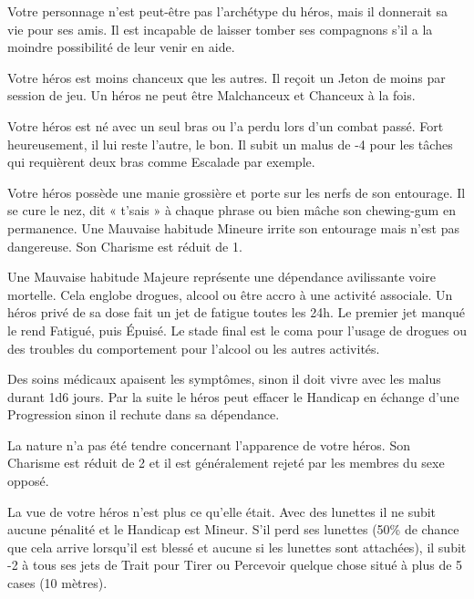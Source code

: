 \begin{description}[align=left]
    \item [Loyal (Mineur)]
        Votre personnage n’est peut-être pas l’archétype du héros, mais il donnerait sa vie pour ses amis. Il est incapable de laisser tomber ses compagnons s’il a la moindre possibilité de leur venir en aide.

    \item [Malchanceux (Majeur)]
        Votre héros est moins chanceux que les autres. Il reçoit un Jeton de moins par session de jeu. Un héros ne peut être Malchanceux et Chanceux à la fois.

    \item [Manchot (Majeur)]
        Votre héros est né avec un seul bras ou l’a perdu lors d’un combat passé. Fort heureusement, il lui reste l’autre, le bon. Il subit un malus de -4 pour les tâches qui requièrent deux bras comme Escalade par exemple.

    \item [Mauvaise habitude (Mineur ou Majeur)]
        Votre héros possède une manie grossière et porte sur les nerfs de son entourage. Il se cure le nez, dit « t’sais » à chaque phrase ou bien mâche son chewing-gum en permanence. Une Mauvaise habitude Mineure irrite son entourage mais n’est pas dangereuse. Son Charisme est réduit de 1.

        Une Mauvaise habitude Majeure représente une dépendance avilissante voire mortelle. Cela englobe drogues, alcool ou être accro à une activité associale. Un héros privé de sa dose fait un jet de fatigue toutes les 24h. Le premier jet manqué le rend Fatigué, puis Épuisé. Le stade final est le coma pour l’usage de drogues ou des troubles du comportement pour l’alcool ou les autres activités.

        Des soins médicaux apaisent les symptômes, sinon il doit vivre avec les malus durant 1d6 jours. Par la suite le héros peut effacer le Handicap en échange d’une Progression sinon il rechute dans sa dépendance.

    \item [Moche (Mineur)]
        La nature n’a pas été tendre concernant l’apparence de votre héros. Son Charisme est réduit de 2 et il est généralement rejeté par les membres du sexe opposé.

    \item [Myope (Mineur)]
        La vue de votre héros n’est plus ce qu’elle était. Avec des lunettes il ne subit aucune pénalité et le Handicap est Mineur. S’il perd ses lunettes (50\% de chance que cela arrive lorsqu’il est blessé et aucune si les lunettes sont attachées), il subit -2 à tous ses jets de Trait pour Tirer ou Percevoir quelque chose situé à plus de 5 cases (10 mètres).


\end{description}

